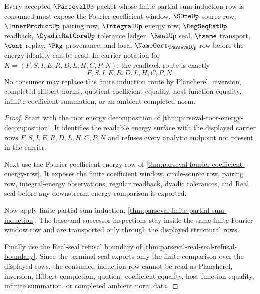 \begin{theorem}
\label{thm:parseval-finite-energy-induction-readback}
Every accepted $\ParsevalUp$ packet whose finite partial-sum induction row is consumed must expose the Fourier coefficient window, $\SOneUp$ source row, $\InnerProductUp$ pairing row, $\IntegralUp$ energy row, $\RegSeqRatUp$ readback, $\DyadicRatCoreUp$ tolerance ledger, $\RealUp$ seal, $\hsame$ transport, $\Cont$ replay, $\Pkg$ provenance, and local $\NameCert_{\ParsevalUp}$ row before the energy identity can be read. In carrier notation for $K=(F,S,I,E,R,D,L,H,C,P,N)$, the readback route is exactly
$$
F,S,I,E,R,D,L,H,C,P,N .
$$
No consumer may replace this finite induction route by Plancherel, inversion, completed Hilbert norms, quotient coefficient equality, host function equality, infinite coefficient summation, or an ambient completed norm.
\end{theorem}
\begin{proof}
Start with the root energy decomposition of \autoref{thm:parseval-root-energy-decomposition}. It identifies the readable energy surface with the displayed carrier rows $F,S,I,E,R,D,L,H,C,P,N$ and refuses every analytic endpoint not present in the carrier.

Next use the Fourier coefficient energy row of \autoref{thm:parseval-fourier-coefficient-energy-row}. It exposes the finite coefficient window, circle-source row, pairing row, integral-energy observations, regular readback, dyadic tolerances, and Real seal before any downstream energy comparison is exported.

Now apply finite partial-sum induction, \autoref{thm:parseval-finite-partial-sum-induction}. The base and successor inspections stay inside the same finite Fourier window row and are transported only through the displayed structural rows.

Finally use the Real-seal refusal boundary of \autoref{thm:parseval-real-seal-refusal-boundary}. Since the terminal seal exports only the finite comparison over the displayed rows, the consumed induction row cannot be read as Plancherel, inversion, Hilbert completion, quotient coefficient equality, host function equality, infinite summation, or completed ambient norm data.
\end{proof}

